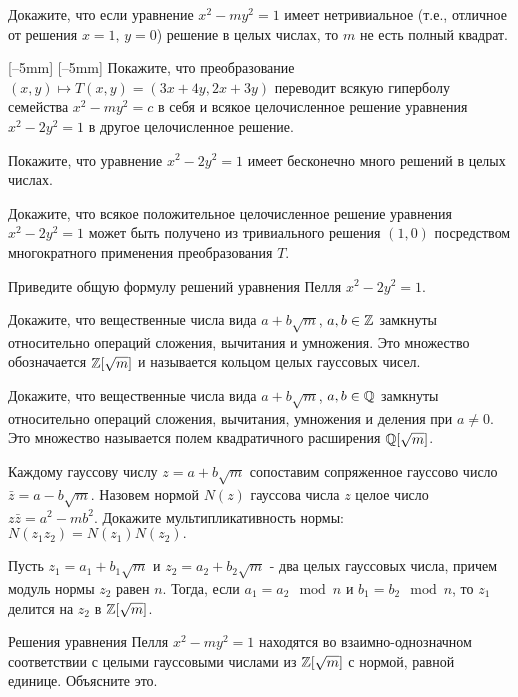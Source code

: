 \documentclass[a4paper,12pt]{article}
\let\ZZ=\Z
\let\QQ=\Q
\newcommand{\rightpicture}[4]%
{\ifthenelse{\lengthtest{10mm>#3mm}}%
{\marginnote{\hbox to #1 {\hss\texttt{[image: \#4]}}}[-#2]}%
{\marginnote{\hbox to #1 {\hss\texttt{[image: \#4]}}}[-#2]}}
\begin{document}

\noindent

 Докажите, что если уравнение $x^2-my^2=1$
имеет нетривиальное (т.е., отличное от решения $x=1,\,y=0$)
решение в целых числах, то $m$ не есть полный квадрат.




%






\rightpicture{0mm}{-5mm}{60mm}{pell_hyperbola}
Покажите, что преобразование $(x,y)\mapsto T(x,y)= (3x+4y,2x+3y)$ переводит
всякую гиперболу семейства $x^2-my^2=c$ в себя и всякое
 целочисленное решение уравнения $x^2-2y^2=1$ в другое целочисленное решение.

 Покажите, что уравнение $x^2-2y^2=1$ имеет бесконечно много решений
в целых числах.

 Докажите, что всякое положительное целочисленное решение уравнения
$x^2-2y^2=1$ может быть получено из тривиального решения $(1,0)$ посредством
многократного применения преобразования $T$.

 Приведите общую формулу решений уравнения Пелля $x^2-2y^2=1$.


 Докажите, что вещественные числа вида $a+b\sqrt{m}$, $a,b\in\ZZ$
замкнуты относительно операций сложения, вычитания и умножения.
Это множество обозначается $\ZZ[\sqrt{m}]$ и называется кольцом целых
гауссовых чисел.

 Докажите, что вещественные числа вида $a+b\sqrt{m}$, $a,b\in\QQ$
замкнуты относительно операций сложения, вычитания, умножения и деления при
$a\not=0$.
Это множество  называется полем
квадратичного расширения $\QQ[\sqrt{m}]$.

 Каждому гауссову числу $z=a+b\sqrt{m}$ сопоставим сопряженное
гауссово число $\bar{z}=a-b\sqrt{m}$.
Назовем нормой $N(z)$ гауссова числа $z$ целое число $z\bar{z}=a^2-mb^2$.
 Докажите мультипликативность нормы: $N(z_1z_2)=N(z_1)N(z_2).$

 Пусть $z_1=a_1+b_1\sqrt{m}$ и $z_2=a_2+b_2\sqrt{m}$ -
два целых гауссовых числа, причем модуль нормы $z_2$ равен $n$. Тогда, если
$a_1=a_2 \mod n$ и $b_1=b_2 \mod n$, то $z_1$ делится на $z_2$ в $\ZZ[\sqrt{m}]$.

 Решения уравнения Пелля $x^2-my^2=1$ находятся во взаимно-однозначном
соответствии с целыми гауссовыми числами из $\ZZ[\sqrt{m}]$ с нормой, равной
единице. Объясните это.
\end{document}
